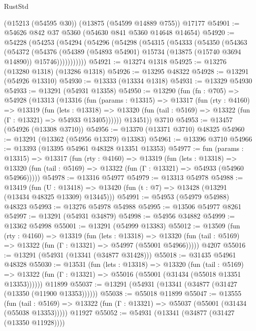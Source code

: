 \begin{lexlean}{RustStd}
\begin{coremodule}
    (@15213 (@54595 @30))
    (@13875 (@54599 @14889 @755))
    @17177
@54901 := @54626 @842 @37 @5360 (@54630 @841 @5360 @14648 @14654)
@54920 := @54228
    (@54253
      (@54294
        (@54296
          (@54298
            (@54315
              (@54333
                (@54350
                  (@54363
                    (@54372
                      (@54376
                        (@54389
                          (@54893 @54901)
                          @15734
                          (@13875 (@15740 @3694 @14890))
                          @15746)))))))))))
@54921 := @13274 @1318
@54925 := @13276 (@13280 @1318) (@13286 @1318)
@54926 := @13295 @48322
@54928 := @13291 (@54926 @13310)
@54930 := @13333 (@13334 @1318)
@54931 := @13329 @54930
@54933 := @13291 (@54931 @13358)
@54950 := @13290
    (fun (fn : @705) =>
    @54928
      (@13313
        (@13316
          (fun (params : @13315) =>
          @13317
            (fun (rty : @4160) =>
            @13319
              (fun (lets : @13318) =>
              @13320 (fun (tail : @5169) => @13322 (fun (Γ : @13321) => @54933 @13405))))))
        @13451))
    @3710
@54953 := @13457 (@54926 (@13308 @3710))
@54956 := @13370 (@13371 @3710) @48325
@54960 := @13291 (@13362 (@54956 @13379) @13383)
@54961 := @13396 @3710
@54966 := @13393 (@13395 @54961 @48328 @13351 @13353)
@54977 := fun (params : @13315) =>
  @13317
    (fun (rty : @4160) =>
    @13319
      (fun (lets : @13318) =>
      @13320 (fun (tail : @5169) => @13322 (fun (Γ : @13321) => @54933 (@54960 @54966)))))
@54978 := @13316 @54977
@54979 := @13313 @54978
@54988 := @13419
    (fun (U : @13418) => @13420 (fun (t : @7) => @13428 (@13291 (@13434 @48325 @13309) @13445)))
@54991 := @54953 (@54979 @54988) @48323
@54993 := @13276 @54978 @54988
@54995 := @13506 @54977 @8261
@54997 := @13291 (@54931 @34879)
@54998 := @54956 @34882
@54999 := @13362 @54998
@55001 := @13291 (@54999 @13383)
@55012 := @13509
    (fun (rty : @4160) =>
    @13319
      (fun (lets : @13318) =>
      @13320 (fun (tail : @5169) => @13322 (fun (Γ : @13321) => @54997 (@55001 @54966)))))
    @4207
@55016 := @13291 (@54931 (@13341 (@34877 @31428)))
@55018 := @31435 @54961 @48328
@55030 := @13531
    (fun (lets : @13318) =>
    @13320
      (fun (tail : @5169) =>
      @13322 (fun (Γ : @13321) => @55016 (@55001 (@31434 (@55018 @13351 @13353))))))
    @11899
@55037 := @13291 (@54931 (@13341 (@34877 (@31427 (@13350 (@11900 @13353))))))
@55038 := @55018 @11899
@55047 := @13555
    (fun (tail : @5169) => @13322 (fun (Γ : @13321) => @55037 (@55001 (@31434 (@55038 @13353)))))
    @11927
@55052 := @54931 (@13341 (@34877 (@31427 (@13350 @11928))))

\end{coremodule}
\end{lexlean}
